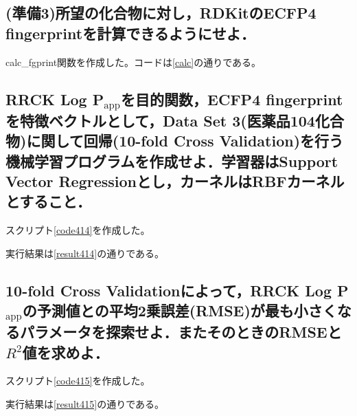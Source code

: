 \documentclass[uplatex,a4j]{jsarticle}
\begin{document}
  \subsection{(準備3)所望の化合物に対し，RDKitのECFP4 fingerprintを計算できるようにせよ．}
  calc\_fgprint関数を作成した。コードは\ref{calc}の通りである。
  
  
  \subsection{RRCK Log P$_\text{app}$を目的関数，ECFP4 fingerprintを特徴ベクトルとして，Data Set 3(医薬品104化合物)に関して回帰(10-fold Cross Validation)を行う機械学習プログラムを作成せよ．学習器はSupport Vector Regressionとし，カーネルはRBFカーネルとすること．}
  スクリプト\ref{code414}を作成した。
  
  実行結果は\ref{result414}の通りである。
  
  
  \subsection{10-fold Cross Validationによって，RRCK Log P$_\text{app}$の予測値との平均2乗誤差(RMSE)が最も小さくなるパラメータを探索せよ．またそのときのRMSEと$R^2$値を求めよ．}
  スクリプト\ref{code415}を作成した。
  
  実行結果は\ref{result415}の通りである。
  
  
\end{document}
